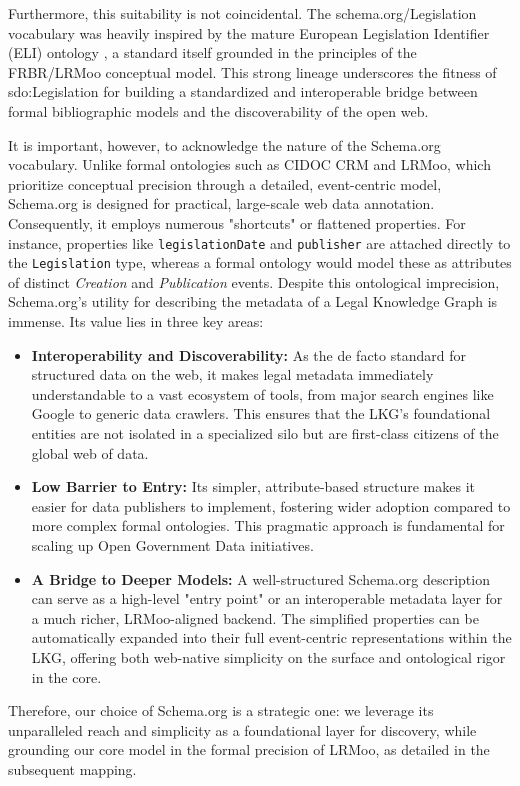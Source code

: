 \documentclass[11pt]{article}
\begin{document}
Furthermore, this suitability is not coincidental. The schema.org/Legislation vocabulary was heavily inspired by the mature European Legislation Identifier (ELI) ontology \cite{eli-guide}, a standard itself grounded in the principles of the FRBR/LRMoo conceptual model. This strong lineage underscores the fitness of sdo:Legislation for building a standardized and interoperable bridge between formal bibliographic models and the discoverability of the open web.

It is important, however, to acknowledge the nature of the Schema.org vocabulary. Unlike formal ontologies such as CIDOC CRM and LRMoo, which prioritize conceptual precision through a detailed, event-centric model, Schema.org is designed for practical, large-scale web data annotation. Consequently, it employs numerous "shortcuts" or flattened properties. For instance, properties like \texttt{legislationDate} and \texttt{publisher} are attached directly to the \texttt{Legislation} type, whereas a formal ontology would model these as attributes of distinct \textit{Creation} and \textit{Publication} events.
Despite this ontological imprecision, Schema.org's utility for describing the metadata of a Legal Knowledge Graph is immense. Its value lies in three key areas:
\begin{itemize}[noitemsep, topsep=0pt]
\item \textbf{Interoperability and Discoverability:} As the de facto standard for structured data on the web, it makes legal metadata immediately understandable to a vast ecosystem of tools, from major search engines like Google to generic data crawlers. This ensures that the LKG's foundational entities are not isolated in a specialized silo but are first-class citizens of the global web of data.
\item \textbf{Low Barrier to Entry:} Its simpler, attribute-based structure makes it easier for data publishers to implement, fostering wider adoption compared to more complex formal ontologies. This pragmatic approach is fundamental for scaling up Open Government Data initiatives.
\item \textbf{A Bridge to Deeper Models:} A well-structured Schema.org description can serve as a high-level "entry point" or an interoperable metadata layer for a much richer, LRMoo-aligned backend. The simplified properties can be automatically expanded into their full event-centric representations within the LKG, offering both web-native simplicity on the surface and ontological rigor in the core.
\end{itemize}
Therefore, our choice of Schema.org is a strategic one: we leverage its unparalleled reach and simplicity as a foundational layer for discovery, while grounding our core model in the formal precision of LRMoo, as detailed in the subsequent mapping.
\end{document}

